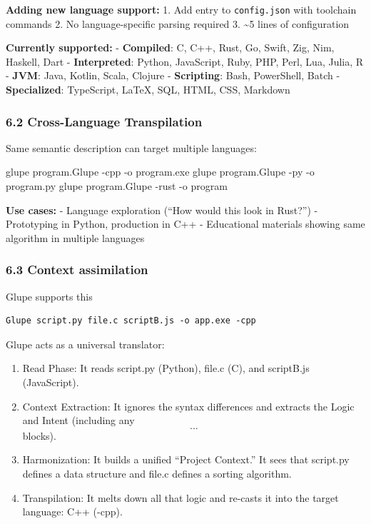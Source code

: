\documentclass[11pt, a4paper]{article}
\providecommand{\tightlist}{\setlength{\itemsep}{0pt}\setlength{\parskip}{0pt}}
\newenvironment{Shaded}{\begin{snugshade}}{\end{snugshade}}
\newcommand{\AttributeTok}[1]{\textcolor[rgb]{0.77,0.63,0.00}{#1}}
\newcommand{\ExtensionTok}[1]{#1}
\newcommand{\NormalTok}[1]{#1}
\begin{document}
\textbf{Adding new language support:} 1. Add entry to
\texttt{config.json} with toolchain commands 2. No language-specific
parsing required 3. \textasciitilde5 lines of configuration

\textbf{Currently supported:} - \textbf{Compiled}: C, C++, Rust, Go,
Swift, Zig, Nim, Haskell, Dart - \textbf{Interpreted}: Python,
JavaScript, Ruby, PHP, Perl, Lua, Julia, R - \textbf{JVM}: Java, Kotlin,
Scala, Clojure - \textbf{Scripting}: Bash, PowerShell, Batch -
\textbf{Specialized}: TypeScript, LaTeX, SQL, HTML, CSS, Markdown

\subsubsection{6.2 Cross-Language
Transpilation}\label{cross-language-transpilation}

Same semantic description can target multiple languages:

\begin{Shaded}
\begin{Highlighting}[]
\ExtensionTok{glupe}\NormalTok{ program.Glupe }\AttributeTok{{-}cpp} \AttributeTok{{-}o}\NormalTok{ program.exe}
\ExtensionTok{glupe}\NormalTok{ program.Glupe }\AttributeTok{{-}py}  \AttributeTok{{-}o}\NormalTok{ program.py}
\ExtensionTok{glupe}\NormalTok{ program.Glupe }\AttributeTok{{-}rust} \AttributeTok{{-}o}\NormalTok{ program}
\end{Highlighting}
\end{Shaded}

\textbf{Use cases:} - Language exploration (``How would this look in
Rust?'') - Prototyping in Python, production in C++ - Educational
materials showing same algorithm in multiple languages

\subsubsection{6.3 Context assimilation}\label{context-assimilation}

Glupe supports this

\begin{verbatim}
Glupe script.py file.c scriptB.js -o app.exe -cpp 
\end{verbatim}

Glupe acts as a universal translator:

\begin{enumerate}
\def\labelenumi{\arabic{enumi}.}
\tightlist
\item
  Read Phase: It reads script.py (Python), file.c (C), and scriptB.js
  (JavaScript).
\item
  Context Extraction: It ignores the syntax differences and extracts the
  Logic and Intent (including any \[{ ... }\] blocks).
\item
  Harmonization: It builds a unified ``Project Context.'' It sees that
  script.py defines a data structure and file.c defines a sorting
  algorithm.
\item
  Transpilation: It melts down all that logic and re-casts it into the
  target language: C++ (-cpp).
\end{enumerate}
\end{document}
